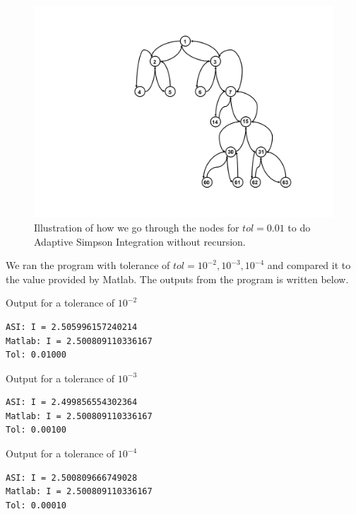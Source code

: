 \documentclass[a4paper,10pt]{article}
\begin{document}
\begin{figure}[h!]
	\centering
	\includegraphics[width=\textwidth]{tree_graph}
	\caption{Illustration of how we go through the nodes for $tol=0.01$ to do Adaptive Simpson Integration without recursion.}
	\label{fig: tree}
\end{figure}

We ran the program with tolerance of $tol=10^{-2}, 10^{-3}, 10^{-4}$ and compared it to the value provided by Matlab. The outputs from the program is written below.
\newline

Output for a tolerance of $10^{-2}$
\begin{center}
\begin{lstlisting}
ASI: I = 2.505996157240214
Matlab: I = 2.500809110336167
Tol: 0.01000
\end{lstlisting}
\end{center}

Output for a tolerance of $10^{-3}$
\begin{center}
\begin{lstlisting}
ASI: I = 2.499856554302364
Matlab: I = 2.500809110336167
Tol: 0.00100
\end{lstlisting}
\end{center}

Output for a tolerance of $10^{-4}$
\begin{center}
\begin{lstlisting}
ASI: I = 2.500809666749028
Matlab: I = 2.500809110336167
Tol: 0.00010
\end{lstlisting}
\end{center}
\end{document}
